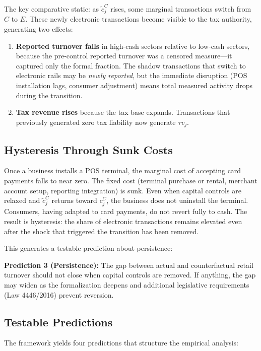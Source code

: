 \documentclass[12pt]{article}
\begin{document}
The key comparative static: as $\tilde{c}_j^C$ rises, some marginal transactions switch from $C$ to $E$. These newly electronic transactions become visible to the tax authority, generating two effects:

\begin{enumerate}
    \item \textbf{Reported turnover falls} in high-cash sectors relative to low-cash sectors, because the pre-control reported turnover was a censored measure---it captured only the formal fraction. The shadow transactions that switch to electronic rails may be \emph{newly reported}, but the immediate disruption (POS installation lags, consumer adjustment) means total measured activity drops during the transition.
    \item \textbf{Tax revenue rises} because the tax base expands. Transactions that previously generated zero tax liability now generate $\tau v_j$.
\end{enumerate}

\subsection{Hysteresis Through Sunk Costs}

Once a business installs a POS terminal, the marginal cost of accepting card payments falls to near zero. The fixed cost (terminal purchase or rental, merchant account setup, reporting integration) is sunk. Even when capital controls are relaxed and $\tilde{c}_j^C$ returns toward $c_j^C$, the business does not uninstall the terminal. Consumers, having adapted to card payments, do not revert fully to cash. The result is hysteresis: the share of electronic transactions remains elevated even after the shock that triggered the transition has been removed.

This generates a testable prediction about persistence:

\textbf{Prediction 3 (Persistence):} The gap between actual and counterfactual retail turnover should not close when capital controls are removed. If anything, the gap may widen as the formalization deepens and additional legislative requirements (Law 4446/2016) prevent reversion.

\subsection{Testable Predictions}

The framework yields four predictions that structure the empirical analysis:
\end{document}
